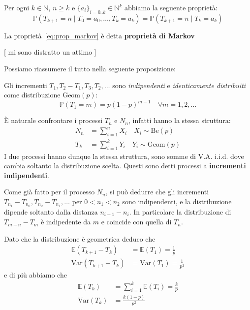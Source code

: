 \begin{theorem}{}
    Per ogni \(k \in \mathbb{N}\), \(n \ge k\) e \(\{a_{i}\}_{i=0. .k} \in
    \mathbb{N}^{k} \) abbiamo la seguente proprietà:
    \begin{equation}\label{eq:prop_markov}
      \mathbb{P} {(T_{k+1} = n \;|\; T_{0} = a_{0}, \dots, T_k = a_k )} =
      \mathbb{P}{(T_{k+1} = n \;|\; T_k = a_k)}
    \end{equation}

\end{theorem}
\begin{remark}{}
    La proprietà~\eqref{eq:prop_markov} è detta \textbf{proprietà di Markov}
\end{remark}

[ mi sono distratto un attimo ]

Possiamo riassumere il tutto nella seguente proposizione:
\begin{proposition}{}
    Gli incrementi \(T_{1}, T_{2}-T_{1}, T_{3}, T_{2}, \dots\) sono
    \emph{indipendenti} e \emph{identicamente distribuiti} come distribuzione
    \(\mathrm{Geom}{(p)}\): 
    \[
      \mathbb{P}{(T_{1} = m)} = p {(1-p)}^{m-1} \quad \forall m = 1, 2, \dots
    \]
\end{proposition}

È naturale confrontare i processi \(T_{n}\) e \(N_n\), infatti hanno la stessa
struttura:
\begin{align*}
    N_n &= \sum_{i=1}^{n} X_i \quad X_{i} \sim \mathrm{Be}{(p)}   \\
    T_k &= \sum_{i=1}^{k} Y_i \quad Y_{i} \sim \mathrm{Geom}{(p)} 
\end{align*}
I due processi hanno dunque la stessa struttura, sono somme di V.A. i.i.d. dove
cambia soltanto la distribuzione scelta. Questi sono detti processi a
\textbf{incrementi indipendenti}.

\begin{remark}{}
    Come già fatto per il processo \(N_n\), si può dedurre che gli incrementi
    \(T_{n_{1}} - T_{n_{0}}, T_{n_{2}} - T_{n_{1}} , \dots\) per \(0 < n_{1} <
    n_{2}\) sono indipendenti, e la distribuzione dipende soltanto dalla
    distanza \(n_{i+1} - n_{i}\). In particolare la distribuzione di \(T_{m + n}
    - T_{m} \) è indipedente da \(m\) e coincide con quella di \(T_{n}\).
\end{remark}

Dato che la distribuzione è geometrica deduco che 
\begin{align*}
    \mathbb{E}{(T_{k+1} - T_k)} &= \mathbb{E}{(T_{1})} = \frac{1}{p} \\
  \mathrm{Var}{(T_{k+1} - T_k)} &= \mathrm{Var}{(T_{1})} = \frac{1}{p^2}
\end{align*}
e di più abbiamo che
\begin{align*}
    \mathbb{E}{(T_k)} &= \sum_{i=1}^{k} \mathbb{E}{(T_{i})} = \frac{k}{p} \\ 
    \mathrm{Var}{(T_k)} &= \frac{k{(1-p)}}{p^2}
\end{align*}

